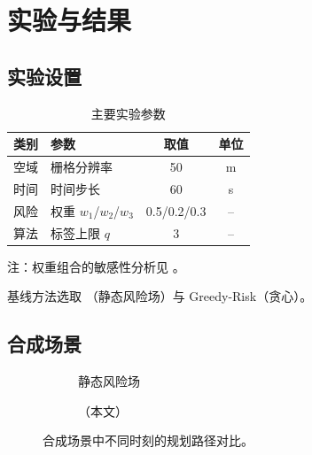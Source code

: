 
\section{实验与结果}
\label{sec:experiments}

\subsection{实验设置}

\begin{table}[t]
  \centering
  \caption{主要实验参数}
  \label{tab:settings}
  \begin{threeparttable}
  \begin{tabular}{@{}llcc@{}}
    \toprule
    类别 & 参数 & 取值 & 单位 \\
    \midrule
    空域   & 栅格分辨率     & \num{50}            & \si{\metre} \\
    时间   & 时间步长       & \num{60}            & \si{\second} \\
    风险   & 权重 $w_1$/$w_2$/$w_3$ & 0.5/0.2/0.3 & -- \\
    算法   & 标签上限 $q$   & \num{3}             & -- \\
    \bottomrule
  \end{tabular}
  \begin{tablenotes}
    \footnotesize \item[] 注：权重组合的敏感性分析见 。
  \end{tablenotes}
  \end{threeparttable}
\end{table}

基线方法选取 \basestatic（静态风险场）与 Greedy-Risk（贪心）。

\subsection{合成场景}

\begin{figure}[t]
  \centering
  \begin{subfigure}[b]{0.48\linewidth}
    \centering
    \caption{静态风险场}
    \label{fig:synthetic-static}
  \end{subfigure}
  \hfill
  \begin{subfigure}[b]{0.48\linewidth}
    \centering
    \caption{\methodnamelatex（本文）}
    \label{fig:synthetic-ours}
  \end{subfigure}
  \caption{合成场景中不同时刻的规划路径对比。}
  \label{fig:synthetic}
\end{figure}

